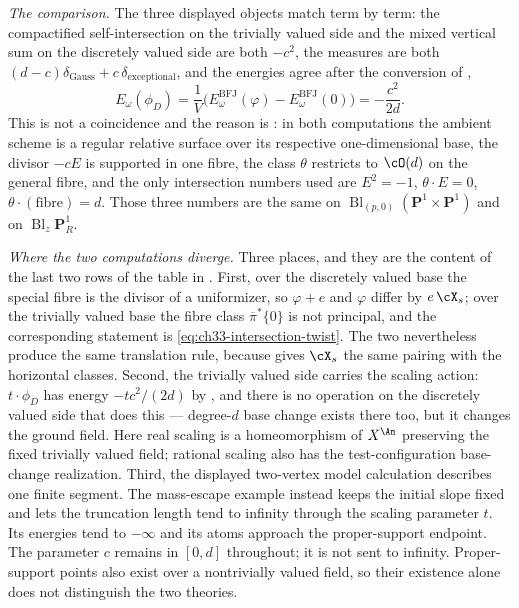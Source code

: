 \begin{example}
\emph{The comparison.}  The three displayed objects match term by term:
the compactified self-intersection on the trivially valued side and the
mixed vertical sum on the discretely valued side are both $-c^2$, the
measures are both
$(d-c)\delta_{\text{Gauss}}+c\,\delta_{\text{exceptional}}$, and the
energies agree after the conversion of ,
\[
 E_\omega(\phi_D)=\frac1V
 \bigl(E^{\mathrm{BFJ}}_\omega(\varphi)-E^{\mathrm{BFJ}}_\omega(0)\bigr)
 =-\frac{c^2}{2d}.
\]
This is not a coincidence and the reason is
: in both computations the ambient scheme is a
regular relative surface over its respective one-dimensional base,
the divisor $-cE$ is
supported in one fibre, the class $\theta$ restricts to $\cO(d)$ on the
general fibre, and the only intersection numbers used are
$E^2=-1$, $\theta\cdot E=0$, $\theta\cdot(\text{fibre})=d$.  Those
three numbers are the same on $\operatorname{Bl}_{(p,0)}
(\mathbf P^1\times\mathbf P^1)$ and on $\operatorname{Bl}_z\mathbf P^1_R$.

\emph{Where the two computations diverge.}  Three places, and they are the
content of the last two rows of the table in .  First,
over the discretely valued base the special fibre is the divisor of a
uniformizer, so $\varphi+e$ and $\varphi$ differ by $e\,\cX_s$; over
the trivially valued base the fibre class $\overline\pi^*\{0\}$ is not
principal, and the corresponding statement is
\eqref{eq:ch33-intersection-twist}.  The two nevertheless produce the same
translation rule, because  gives $\cX_s$ the same
pairing with the horizontal classes.  Second, the trivially valued side
carries the scaling action: $t\cdot\phi_D$ has energy $-tc^2/(2d)$ by
, and there is no operation on the discretely
valued side that does this --- degree-$d$ base change exists there too,
but it changes the ground field.  Here real scaling is a homeomorphism
of $X^{\An}$ preserving the fixed trivially valued field; rational
scaling also has the test-configuration base-change realization.  Third, the displayed two-vertex model calculation describes one finite
segment. The mass-escape example instead keeps the initial slope fixed
and lets the truncation length tend to infinity through the scaling
parameter $t$. Its energies tend to $-\infty$ and its atoms approach the
proper-support endpoint. The parameter $c$ remains in $[0,d]$ throughout;
it is not sent to infinity. Proper-support points also exist over a
nontrivially valued field, so their existence alone does not distinguish
the two theories.
\end{example}

